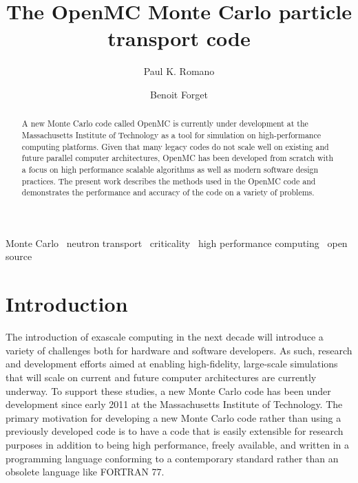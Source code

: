 \documentclass[authoryear,preprint]{elsarticle}
\begin{document}
\begin{frontmatter}

\title{The OpenMC Monte Carlo particle transport code}
\author{Paul K. Romano}

\author{Benoit Forget\corref{}}

\address{Massachusetts Institute of Technology, Department of Nuclear Science
  and Engineering, 77 Massachusetts Avenue, Building 24-607, Cambridge, MA
  02139, United States}

\begin{abstract}
A new Monte Carlo code called OpenMC is currently under development at the
Massachusetts Institute of Technology as a tool for simulation on
high-performance computing platforms. Given that many legacy codes do not scale
well on existing and future parallel computer architectures, OpenMC has been
developed from scratch with a focus on high performance scalable algorithms as
well as modern software design practices. The present work describes the methods
used in the OpenMC code and demonstrates the performance and accuracy of the
code on a variety of problems.
\end{abstract}

\begin{keyword}
  Monte Carlo \ neutron transport \ criticality \ high performance computing
  \ open source
\end{keyword}

\end{frontmatter}

\section{Introduction}

The introduction of exascale computing in the next decade will introduce a
variety of challenges both for hardware and software developers. As such,
research and development efforts aimed at enabling high-fidelity, large-scale
simulations that will scale on current and future computer architectures are
currently underway. To support these studies, a new Monte Carlo code has been
under development since early 2011 at the Massachusetts Institute of
Technology. The primary motivation for developing a new Monte Carlo code rather
than using a previously developed code is to have a code that is easily
extensible for research purposes in addition to being high performance, freely
available, and written in a programming language conforming to a contemporary
standard rather than an obsolete language like FORTRAN 77.
\end{document}
